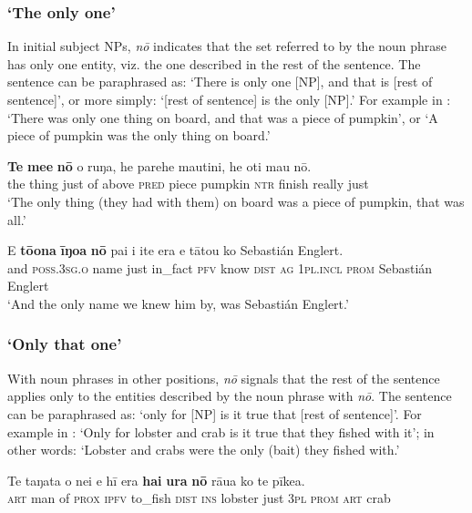 \subsubsection{‘The only one’}\label{sec:5.8.2.1}

In initial subject NPs, \textit{nō} indicates that the set referred to by the noun phrase has only one entity, viz. the one described in the rest of the sentence. The sentence can be paraphrased as: ‘There is only one [NP], and that is [rest of sentence]’, or more simply: ‘[rest of sentence] is the only [NP].’ For example in : ‘There was only one thing on board, and that was a piece of pumpkin’, or ‘A piece of pumpkin was the only thing on board.’ 

\ea\label{ex:5.144}
\gll \textbf{Te} \textbf{me{\ꞌ}e} \textbf{nō} o ruŋa, he parehe mautini, he oti mau nō. \\
the thing just of above \textsc{pred} piece pumpkin \textsc{ntr} finish really just \\

\glt 
‘The only thing (they had with them) on board was a piece of pumpkin, that was all.’ \textstyleExampleref{[R303.054]} 
\z

\ea\label{ex:5.145}
\gll {\ꞌ}E \textbf{tō{\ꞌ}ona} \textbf{{\ꞌ}īŋoa} \textbf{nō} pa{\ꞌ}i i {\ꞌ}ite era e tātou ko Sebastián Englert. \\
and \textsc{poss.3sg.o} name just in\_fact \textsc{pfv} know \textsc{dist} \textsc{ag} \textsc{1pl.incl} \textsc{prom} Sebastián Englert \\

\glt 
‘And the only name we knew him by, was Sebastián Englert.’ \textstyleExampleref{[R375.005]} 
\z

\subsubsection{‘Only that one’}\label{sec:5.8.2.2}

With noun phrases in other positions, \textit{nō} signals that the rest of the sentence applies only to the entities described by the noun phrase with \textit{nō}. The sentence can be paraphrased as: ‘only for [NP] is it true that [rest of sentence]’. For example in : ‘Only for lobster and crab is it true that they fished with it’; in other words: ‘Lobster and crabs were the only (bait) they fished with.’

\ea\label{ex:5.146}
\gll Te taŋata o nei e hī era \textbf{hai} \textbf{{\ꞌ}ura} \textbf{nō} rāua ko te pīkea. \\
\textsc{art} man of \textsc{prox} \textsc{ipfv} to\_fish \textsc{dist} \textsc{ins} lobster just \textsc{3pl} \textsc{prom} \textsc{art} crab \\

